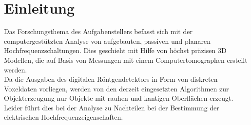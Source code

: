 
\chapter{Einleitung}
Das Forschungsthema des Aufgabenstellers befasst sich mit der computergestützten Analyse von aufgebauten, passiven und planaren Hochfrequenzschaltungen. Dies geschieht mit Hilfe von höchst präzisen 3D Modellen, die auf Basis von Messungen mit einem Computertomographen erstellt werden. \\
Da die Ausgaben des digitalen Röntgendetektors in Form von diskreten Voxeldaten vorliegen, werden von den derzeit eingesetzten Algorithmen zur Objekterzeugung nur Objekte mit rauhen und kantigen Oberflächen erzeugt. Leider führt dies bei der Analyse zu Nachteilen bei der Bestimmung der elektrischen Hochfrequenzeigenschaften. 